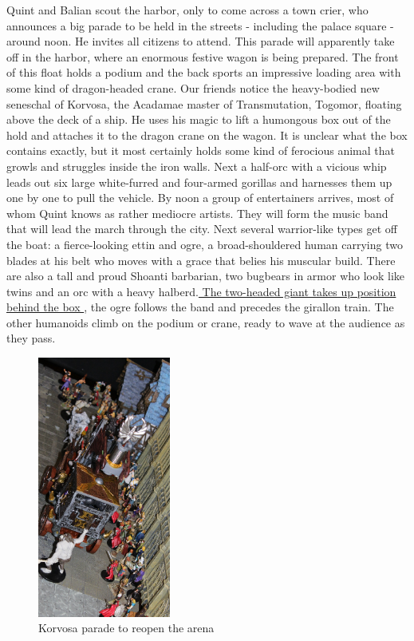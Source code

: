 Quint and Balian scout the harbor, only to come across a town crier, who announces a big parade to be held in the streets - including the palace square - around noon. He invites all citizens to attend. This parade will apparently take off in the harbor, where an enormous festive wagon is being prepared. The front of this float holds a podium and the back sports an impressive loading area with some kind of dragon-headed crane. Our friends notice the heavy-bodied new seneschal of Korvosa, the Acadamae master of Transmutation, Togomor, floating above the deck of a ship. He uses his magic to lift a humongous box out of the hold and attaches it to the dragon crane on the wagon. It is unclear what the box contains exactly, but it most certainly holds some kind of ferocious animal that growls and struggles inside the iron walls. Next a half-orc with a vicious whip leads out six large white-furred and four-armed gorillas and harnesses them up one by one to pull the vehicle. By noon a group of entertainers arrives, most of whom Quint knows as rather mediocre artists. They will form the music band that will lead the march through the city. Next several warrior-like types get off the boat: a fierce-looking ettin and ogre, a broad-shouldered human carrying two blades at his belt who moves with a grace that belies his muscular build. There are also a tall and proud Shoanti barbarian, two bugbears in armor who look like twins and an orc with a heavy halberd.\hyperref[fig:Korvosa-parade-to-reopen-the-arena-613133348]{ The two-headed giant takes up position behind the box } , the ogre follows the band and precedes the girallon train. The other humanoids climb on the podium or crane, ready to wave at the audience as they pass. \\

\begin{figure}[h]
	\centering
	\includegraphics[width=0.39\textwidth]{images/Korvosa-parade-to-reopen-the-arena-613133348.jpg}
	\caption{Korvosa parade to reopen the arena}
	\label{fig:Korvosa-parade-to-reopen-the-arena-613133348}
\end{figure}

